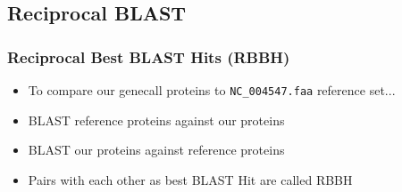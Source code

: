 \documentclass[table]{beamer}
\begin{document}
%
%
%
%
\subsection{Reciprocal BLAST}
\begin{frame}
\frametitle{Reciprocal Best BLAST Hits (RBBH)}
\begin{itemize}
\item To compare our genecall proteins to \texttt{NC\_004547.faa} reference set...
\item BLAST reference proteins against our proteins
\item BLAST our proteins against reference proteins
\item Pairs with each other as best BLAST Hit are called RBBH
\end{itemize}
\end{frame}
\end{document}
